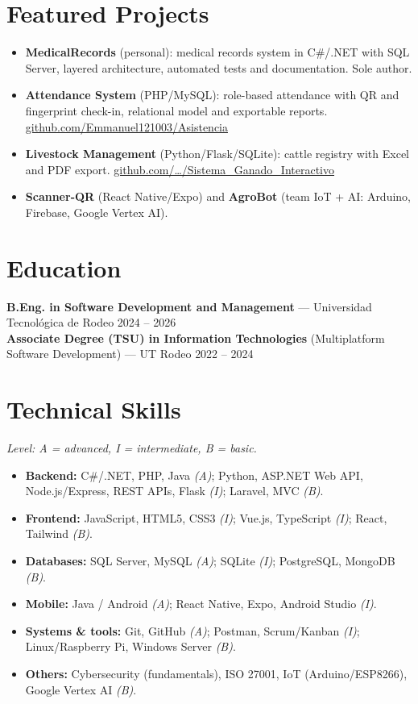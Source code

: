 \documentclass[11pt,a4paper]{article}
\begin{document}
\section{Featured Projects}
\begin{itemize}
  \item \textbf{MedicalRecords} (personal): medical records system in C\#/.NET with SQL Server, layered architecture,
        automated tests and documentation. Sole author.
  \item \textbf{Attendance System} (PHP/MySQL): role-based attendance with QR and fingerprint check-in, relational model
        and exportable reports. \href{https://github.com/Emmanuel121003/Asistencia}{github.com/Emmanuel121003/Asistencia}
  \item \textbf{Livestock Management} (Python/Flask/SQLite): cattle registry with Excel and PDF export.
        \href{https://github.com/Emmanuel121003/Sistema_Ganado_Interactivo}{github.com/…/Sistema\_Ganado\_Interactivo}
  \item \textbf{Scanner-QR} (React Native/Expo) and \textbf{AgroBot} (team IoT + AI: Arduino, Firebase, Google Vertex AI).
\end{itemize}

\section{Education}
\textbf{B.Eng. in Software Development and Management} --- Universidad Tecnológica de Rodeo \hfill {\color{muted}\small 2024 -- 2026}\\[3pt]
\textbf{Associate Degree (TSU) in Information Technologies} (Multiplatform Software Development) --- UT Rodeo \hfill {\color{muted}\small 2022 -- 2024}

\section{Technical Skills}
\textit{Level: A = advanced, I = intermediate, B = basic.}
\begin{itemize}
  \item \textbf{Backend:} C\#/.NET, PHP, Java \textit{(A)}; Python, ASP.NET Web API, Node.js/Express, REST APIs, Flask \textit{(I)}; Laravel, MVC \textit{(B)}.
  \item \textbf{Frontend:} JavaScript, HTML5, CSS3 \textit{(I)}; Vue.js, TypeScript \textit{(I)}; React, Tailwind \textit{(B)}.
  \item \textbf{Databases:} SQL Server, MySQL \textit{(A)}; SQLite \textit{(I)}; PostgreSQL, MongoDB \textit{(B)}.
  \item \textbf{Mobile:} Java / Android \textit{(A)}; React Native, Expo, Android Studio \textit{(I)}.
  \item \textbf{Systems \& tools:} Git, GitHub \textit{(A)}; Postman, Scrum/Kanban \textit{(I)}; Linux/Raspberry Pi, Windows Server \textit{(B)}.
  \item \textbf{Others:} Cybersecurity (fundamentals), ISO 27001, IoT (Arduino/ESP8266), Google Vertex AI \textit{(B)}.
\end{itemize}
\end{document}
